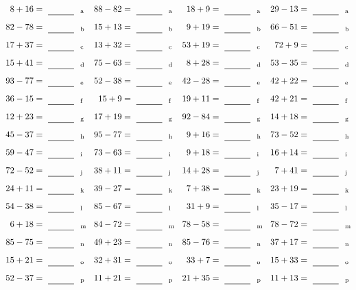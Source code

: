 \documentclass
[
  draft    = true,
  fontsize = 11pt,
  parskip  = half-
]
{scrartcl}
\begin{document}
\clearpage
\begin{align*}
    \pline{8+16}&=\rline{a}
  & \pline{88-82}&=\rline{a}
  & \pline{18+9}&=\rline{a}
  & \pline{29-13}&=\rline{a} \\[1ex]
    \pline{82-78}&=\rline{b}
  & \pline{15+13}&=\rline{b}
  & \pline{9+19}&=\rline{b}
  & \pline{66-51}&=\rline{b} \\[1ex]
    \pline{17+37}&=\rline{c}
  & \pline{13+32}&=\rline{c}
  & \pline{53+19}&=\rline{c}
  & \pline{72+9}&=\rline{c} \\[1ex]
    \pline{15+41}&=\rline{d}
  & \pline{75-63}&=\rline{d}
  & \pline{8+28}&=\rline{d}
  & \pline{53-35}&=\rline{d} \\[1ex]
    \pline{93-77}&=\rline{e}
  & \pline{52-38}&=\rline{e}
  & \pline{42-28}&=\rline{e}
  & \pline{42+22}&=\rline{e} \\[1ex]
    \pline{36-15}&=\rline{f}
  & \pline{15+9}&=\rline{f}
  & \pline{19+11}&=\rline{f}
  & \pline{42+21}&=\rline{f} \\[1ex]
    \pline{12+23}&=\rline{g}
  & \pline{17+19}&=\rline{g}
  & \pline{92-84}&=\rline{g}
  & \pline{14+18}&=\rline{g} \\[1ex]
    \pline{45-37}&=\rline{h}
  & \pline{95-77}&=\rline{h}
  & \pline{9+16}&=\rline{h}
  & \pline{73-52}&=\rline{h} \\[1ex]
    \pline{59-47}&=\rline{i}
  & \pline{73-63}&=\rline{i}
  & \pline{9+18}&=\rline{i}
  & \pline{16+14}&=\rline{i} \\[1ex]
    \pline{72-52}&=\rline{j}
  & \pline{38+11}&=\rline{j}
  & \pline{14+28}&=\rline{j}
  & \pline{7+41}&=\rline{j} \\[1ex]
    \pline{24+11}&=\rline{k}
  & \pline{39-27}&=\rline{k}
  & \pline{7+38}&=\rline{k}
  & \pline{23+19}&=\rline{k} \\[1ex]
    \pline{54-38}&=\rline{l}
  & \pline{85-67}&=\rline{l}
  & \pline{31+9}&=\rline{l}
  & \pline{35-17}&=\rline{l} \\[1ex]
    \pline{6+18}&=\rline{m}
  & \pline{84-72}&=\rline{m}
  & \pline{78-58}&=\rline{m}
  & \pline{78-72}&=\rline{m} \\[1ex]
    \pline{85-75}&=\rline{n}
  & \pline{49+23}&=\rline{n}
  & \pline{85-76}&=\rline{n}
  & \pline{37+17}&=\rline{n} \\[1ex]
    \pline{15+21}&=\rline{o}
  & \pline{32+31}&=\rline{o}
  & \pline{33+7}&=\rline{o}
  & \pline{15+33}&=\rline{o} \\[1ex]
    \pline{52-37}&=\rline{p}
  & \pline{11+21}&=\rline{p}
  & \pline{21+35}&=\rline{p}
  & \pline{11+13}&=\rline{p}
\end{align*}
\end{document}

